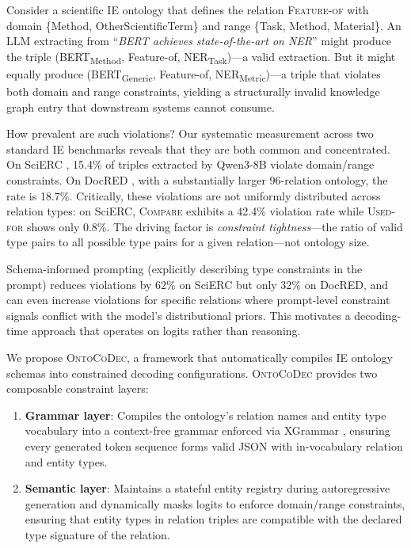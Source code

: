 \documentclass[11pt,a4paper]{article}
\begin{document}
Consider a scientific IE ontology that defines the relation \textsc{Feature-of} with domain \{Method, OtherScientificTerm\} and range \{Task, Method, Material\}.
An LLM extracting from ``\emph{BERT achieves state-of-the-art on NER}'' might produce the triple (BERT\textsubscript{Method}, Feature-of, NER\textsubscript{Task})---a valid extraction.
But it might equally produce (BERT\textsubscript{Generic}, Feature-of, NER\textsubscript{Metric})---a triple that violates both domain and range constraints, yielding a structurally invalid knowledge graph entry that downstream systems cannot consume.

How prevalent are such violations?
Our systematic measurement across two standard IE benchmarks reveals that they are both common and concentrated.
On SciERC \cite{luan2018multi}, 15.4\% of triples extracted by Qwen3-8B violate domain/range constraints.
On DocRED \cite{yao2019docred}, with a substantially larger 96-relation ontology, the rate is 18.7\%.
Critically, these violations are not uniformly distributed across relation types: on SciERC, \textsc{Compare} exhibits a 42.4\% violation rate while \textsc{Used-for} shows only 0.8\%.
The driving factor is \emph{constraint tightness}---the ratio of valid type pairs to all possible type pairs for a given relation---not ontology size.

Schema-informed prompting (explicitly describing type constraints in the prompt) reduces violations by 62\% on SciERC but only 32\% on DocRED, and can even increase violations for specific relations where prompt-level constraint signals conflict with the model's distributional priors.
This motivates a decoding-time approach that operates on logits rather than reasoning.

We propose \textsc{OntoCoDec}, a framework that automatically compiles IE ontology schemas into constrained decoding configurations.
\textsc{OntoCoDec} provides two composable constraint layers:

\begin{enumerate}[leftmargin=*,nosep]
\item \textbf{Grammar layer}: Compiles the ontology's relation names and entity type vocabulary into a context-free grammar enforced via XGrammar \cite{dong2024xgrammar}, ensuring every generated token sequence forms valid JSON with in-vocabulary relation and entity types.
\item \textbf{Semantic layer}: Maintains a stateful entity registry during autoregressive generation and dynamically masks logits to enforce domain/range constraints, ensuring that entity types in relation triples are compatible with the declared type signature of the relation.
\end{enumerate}
\end{document}
